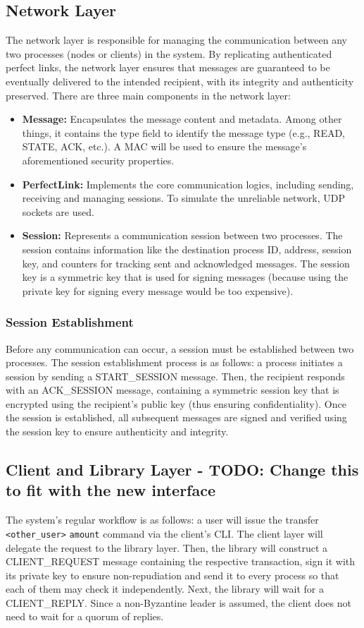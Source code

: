 \documentclass[runningheads]{llncs}
\begin{document}
\subsection{Network Layer}
The network layer is responsible for managing the communication between any two processes (nodes or clients) in the system. By replicating authenticated perfect links, the network layer ensures that messages are guaranteed to be eventually delivered to the intended recipient, with its integrity and authenticity preserved. There are three main components in the network layer:
\begin{itemize}
    \item \textbf{Message:} Encapsulates the message content and metadata. Among other things, it contains the type field to identify the message type (e.g., READ, STATE, ACK, etc.). A MAC will be used to ensure the message's aforementioned security properties.
    \item \textbf{PerfectLink:} Implements the core communication logics, including sending, receiving and managing sessions. To simulate the unreliable network, UDP sockets are used.
    \item \textbf{Session:} Represents a communication session between two processes. The session contains information like the destination process ID, address, session key, and counters for tracking sent and acknowledged messages. The session key is a symmetric key that is used for signing messages (because using the private key for signing every message would be too expensive).
\end{itemize}

\subsubsection{Session Establishment}
Before any communication can occur, a session must be established between two processes. The session establishment process is as follows: a process initiates a session by sending a START\_SESSION message. Then, the recipient responds with an ACK\_SESSION message, containing a symmetric session key that is encrypted using the recipient's public key (thus ensuring confidentiality). Once the session is established, all subsequent messages are signed and verified using the session key to ensure authenticity and integrity.

\subsection{Client and Library Layer - TODO: Change this to fit with the new interface}
The system's regular workflow is as follows: a user will issue the transfer \texttt{<other_user>} \texttt{amount} command via the client's CLI. The client layer will delegate the request to the library layer. Then, the library will construct a CLIENT\_REQUEST message containing the respective transaction, sign it with its private key to ensure non-repudiation and send it to every process so that each of them may check it independently. Next, the library will wait for a CLIENT\_REPLY. Since a non-Byzantine leader is assumed, the client does not need to wait for a quorum of replies.
\end{document}
